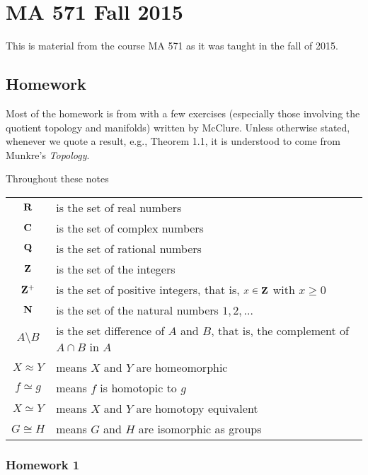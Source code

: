 \section{MA 571 Fall 2015}
This is material from the course MA 571 as it was taught in the fall of
2015.%
\bigskip
\subsection{Homework}
 Most of the homework is from \cite{munkres} with a few exercises
(especially those involving the quotient topology and manifolds) written by
McClure. Unless otherwise stated, whenever we quote a result, e.g., Theorem
1.1, it is understood to come from Munkre's \emph{Topology}.

Throughout these notes

\begin{tabular}{cl}
  $\mathbf{R}$ & is the set of real numbers\\
  $\mathbf{C}$ & is the set of complex numbers\\
  $\mathbf{Q}$ & is the set of rational numbers\\
  $\mathbf{Z}$ & is the set of the integers\\
  $\mathbf{Z}^+$ & is the set of positive integers, that is, $x\in\mathbf{Z}$ with
             $x\geq 0$\\
  $\mathbf{N}$ & is the set of the natural numbers $1,2,\ldots$\\
  $A\setminus B$ & is the set difference of $A$ and $B$, that is, the
                        complement of $A\cap B$ in $A$\\
  $X\approx Y$& means $X$ and $Y$ are homeomorphic\\
  $f\simeq g$& means $f$ is homotopic to $g$\\
  $X\simeq Y$&means $X$ and $Y$ are homotopy equivalent\\
  $G\cong H$& means $G$ and $H$ are isomorphic as groups
\end{tabular}

\newpage
\subsubsection{Homework 1}
\setcounter{exercise}{0}

